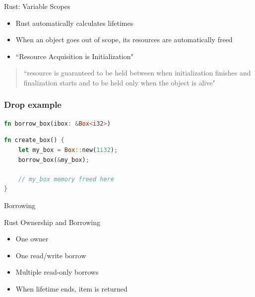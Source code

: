 \documentclass{beamer}
\begin{document}
\begin{frame}{Rust: Variable Scopes}
\begin{block}{} 
\begin{itemize}
\item Rust automatically calculates lifetimes
\item When an object goes out of scope, its resources are automatically freed
\item ``Resource Acquisition is Initialization" 
\end{itemize}
\end{block}
\begin{quote}
``resource is guaranteed to be held between when initialization finishes and finalization starts 
and to be held only when the object is alive"
\end{quote}
\end{frame}


\begin{frame}[fragile]
\frametitle{Drop example}

\begin{lstlisting}[language=Rust]
fn borrow_box(ibox: &Box<i32>)
\end{lstlisting}

\begin{block}{}
\begin{lstlisting}[language=Rust]
fn create_box() {
    let my_box = Box::new(1i32);
    borrow_box(&my_box);

    // my_box memory freed here
}
\end{lstlisting}

\end{block}

\end{frame}


\begin{frame}{Borrowing}
\begin{block}{Rust Ownership and Borrowing}
\begin{itemize} 
	\item One owner
	\item One read/write borrow
	\item Multiple read-only borrows
	\item When lifetime ends, item is returned
\end{itemize} 
\end{block}
\end{frame}
\end{document}
